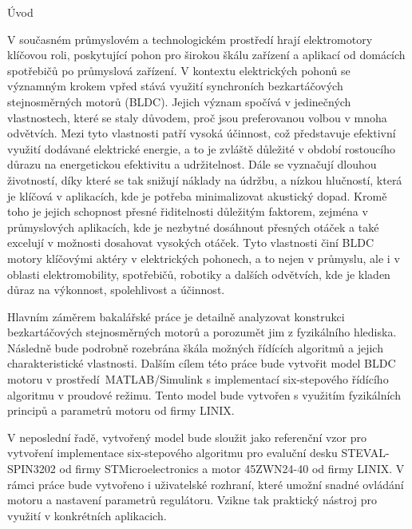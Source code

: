
\chap Úvod


V současném průmyslovém a technologickém prostředí hrají elektromotory klíčovou roli, poskytující pohon pro širokou 
škálu zařízení a aplikací od domácích spotřebičů po průmyslová zařízení. V kontextu elektrických pohonů se významným krokem 
vpřed stává využití synchroních bezkartáčových stejnosměrných motorů (BLDC). Jejich význam spočívá 
v jedinečných vlastnostech, které se staly důvodem, proč jsou preferovanou volbou v mnoha odvětvích. 
Mezi tyto vlastnosti patří vysoká účinnost, což představuje efektivní využití dodávané elektrické energie, a to je zvláště 
důležité v období rostoucího důrazu na energetickou efektivitu a udržitelnost. Dále se vyznačují dlouhou životností, díky které se
 tak snižují náklady na údržbu, a nízkou hlučností, která je klíčová v aplikacích, kde je potřeba minimalizovat akustický dopad. 
Kromě toho je jejich schopnost přesné řiditelnosti důležitým faktorem, zejména v průmyslových aplikacích, kde je nezbytné 
dosáhnout přesných otáček a také excelují v možnosti dosahovat vysokých otáček. Tyto vlastnosti činí BLDC motory klíčovými aktéry v elektrických pohonech, a to 
nejen v průmyslu, ale i v oblasti elektromobility, spotřebičů, robotiky a dalších odvětvích, kde je kladen důraz na 
výkonnost, spolehlivost a účinnost.

Hlavním záměrem bakalářské práce je detailně analyzovat konstrukci bezkartáčových stejnosměrných motorů a porozumět 
jim z fyzikálního hlediska. Následně bude podrobně rozebrána škála možných řídících algoritmů a jejich charakteristické
vlastnosti. Dalším cílem této práce bude vytvořit model BLDC motoru v prostředí~\nobreak{}MATLAB/Simulink s implementací \nobreak{}six-stepového
řídícího algoritmu v proudové režimu. Tento model bude vytvořen s využitím fyzikálních principů a parametrů motoru od 
firmy LINIX.

V neposlední řadě, vytvořený model bude sloužit jako referenční vzor pro vytvoření implementace six-stepového algoritmu pro evaluční 
desku STEVAL-\nobreak{}SPIN3202 od firmy STMicroelectronics a motor 45ZWN24-40 od firmy LINIX. V rámci práce bude vytvořeno i uživatelské rozhraní, které 
umožní snadné ovládání motoru a nastavení parametrů regulátoru. Vzikne tak 
praktický nástroj pro využití v konkrétních aplikacich. 

